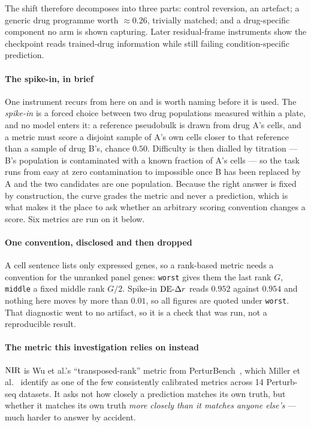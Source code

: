 The shift therefore decomposes into three parts: control reversion, an
artefact; a generic drug programme worth $\approx 0.26$, trivially matched; and
a drug-specific component no arm is shown capturing. Later residual-frame
instruments show the checkpoint reads trained-drug information while still
failing condition-specific prediction.

\paragraph{The spike-in, in brief} One instrument recurs from here on and is
worth naming before it is used. The \emph{spike-in} is a forced choice between
two drug populations measured within a plate, and no model enters it: a
reference pseudobulk is drawn from drug A's cells, and a metric must score a
disjoint sample of A's own cells closer to that reference than a sample of drug
B's, chance $0.50$. Difficulty is then dialled by titration --- B's population is
contaminated with a known fraction of A's cells --- so the task runs from easy at
zero contamination to impossible once B has been replaced by A and the two
candidates are one population. Because the right answer is fixed by
construction, the curve grades the metric and never a prediction, which is what
makes it the place to ask whether an arbitrary scoring convention changes a
score. Six metrics are run on it below.

\paragraph{One convention, disclosed and then dropped} A cell sentence lists
only expressed genes, so a rank-based metric needs a convention for the unranked
panel genes: \texttt{worst} gives them the last rank $G$, \texttt{middle} a
fixed middle rank $G/2$. Spike-in $\textrm{DE-}\Delta r$ reads $0.952$ against $0.954$ and
nothing here moves by more than $0.01$, so all figures are quoted under
\texttt{worst}. That diagnostic went to no artifact, so it is a check that was
run, not a reproducible result.

\paragraph{The metric this investigation relies on instead} $\textrm{NIR}$ is Wu
et al.'s ``transposed-rank'' metric from PerturBench~\cite{perturbench}, which
Miller et al.~\cite{miller} identify as one of the few consistently calibrated
metrics across 14 Perturb-seq datasets. It asks not how closely a prediction
matches its own truth, but whether it matches its own truth \emph{more closely
than it matches anyone else's} --- much harder to answer by accident.

